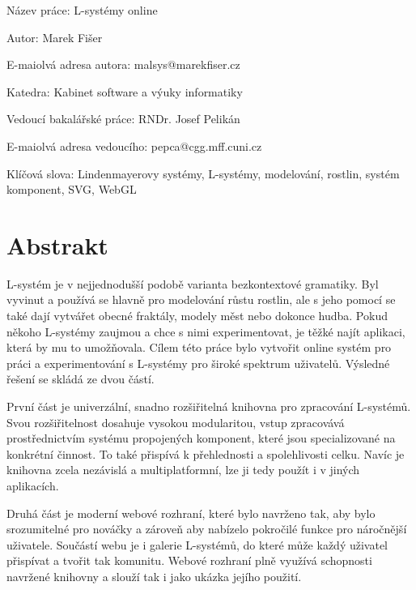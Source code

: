 
{
\setlength\parindent{0mm}
\setlength\parskip{5mm}

Název práce: L-systémy online

Autor: Marek Fišer

E-maiolvá adresa autora: malsys@marekfiser.cz

Katedra: Kabinet software a výuky informatiky

Vedoucí bakalářské práce: RNDr. Josef Pelikán

E-maiolvá adresa vedoucího: pepca@cgg.mff.cuni.cz

Klíčová slova: Lindenmayerovy systémy, L-systémy, modelování, rostlin, systém komponent, SVG, WebGL

\section*{Abstrakt}
}
\mbox{L-systém} je v nejjednodušší podobě varianta bezkontextové gramatiky.
Byl vyvi\-nut a používá se hlavně pro modelování růstu rostlin, ale s jeho pomocí se také dají vytvářet obecné fraktály, modely měst nebo dokonce hudba.
Pokud někoho \mbox{L-systémy} zaujmou a chce s nimi experimentovat, je těžké najít aplikaci, která by mu to umožňovala.
Cílem této práce bylo vytvořit online systém pro práci a experimentování s L-systémy pro široké spektrum uživatelů.
Výsledné řešení se skládá ze dvou částí.

První část je univerzální, snadno rozšiřitelná knihovna pro zpracování \mbox{L-sys}\-témů.
Svou rozšiřitelnost dosahuje vysokou modularitou, vstup zpracovává pros\-třednic\-tvím systému propojených komponent, které jsou specializované na kon\-krét\-ní činnost.
To také přispívá k přehlednosti a spolehlivosti celku.
Navíc je knihovna zcela nezávislá a multiplatformní, lze ji tedy použít i v jiných aplikacích.

Druhá část je moderní webové rozhraní, které bylo navrženo tak, aby bylo srozumitelné pro nováčky a zároveň aby nabízelo pokročilé funkce pro nároč\-nější uživatele.
Součástí webu je i galerie L-systémů, do které může každý uživatel přispívat a tvořit tak komunitu.
Webové rozhraní plně využívá schopnosti navr\-žené knihovny a slouží tak i jako ukázka jejího použití.

\newpage

